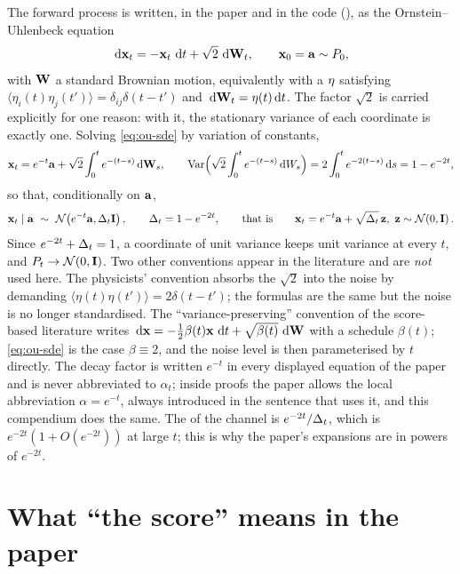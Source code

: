 The forward process is written, in the paper and in the code
(), as the Ornstein--Uhlenbeck equation
\begin{equation}
  \,\mathrm{d}\mathbf{x}_t=-\mathbf{x}_t\,\,\mathrm{d} t+\sqrt2\,\,\mathrm{d}\mathbf{W}_t,\qquad \mathbf{x}_0=\mathbf{a}\sim P_0,
  \label{eq:ou-sde}
\end{equation}
with $\mathbf{W}$ a standard Brownian motion, equivalently with a  $\mathbf{\eta}$ satisfying $\langle\eta_i(t)\eta_j(t')\rangle=\delta_{ij}\delta(t-t')$
and $\,\mathrm{d}\mathbf{W}_t=\mathbf{\eta}(t)\,\mathrm{d} t$. The factor $\sqrt2$ is carried explicitly for one
reason: with it, the stationary variance of each coordinate is exactly one. Solving
\cref{eq:ou-sde} by variation of constants,
\begin{equation}
  \mathbf{x}_t=e^{-t}\mathbf{a}+\sqrt2\int_0^te^{-(t-s)}\,\mathrm{d}\mathbf{W}_s,
  \qquad
  \operatorname{Var}\Bigl(\sqrt2\int_0^te^{-(t-s)}\,\mathrm{d} W_s\Bigr)=2\int_0^te^{-2(t-s)}\,\mathrm{d} s=1-e^{-2t},
\end{equation}
so that, conditionally on $\mathbf{a}$,
\begin{equation}
  \vx_t\mid\va\ \sim\ \normal{e^{-t}\va}{\Dt\Id},\qquad \Dt=1-e^{-2t},
  \qquad\text{that is}\qquad \vx_t=e^{-t}\va+\sqrt{\Dt}\,\vz,\ \vz\sim\normal{0}{\Id}.
  \label{eq:channel-conv}
\end{equation}
Since $e^{-2t}+\Delta_t=1$, a coordinate of unit variance keeps unit variance at every $t$,
and $P_t\to\mathcal{N}\!\left(0,\mathbf{I}\right)$. Two other conventions appear in the literature and are
\emph{not} used here. The physicists' convention absorbs the $\sqrt2$ into the noise
by demanding $\langle\eta(t)\eta(t')\rangle=2\delta(t-t')$; the formulas are the same
but the noise is no longer standardised. The ``variance-preserving'' convention of the
score-based literature writes $\,\mathrm{d}\mathbf{x}=-\tfrac12\beta(t)\mathbf{x}\,\,\mathrm{d} t+\sqrt{\beta(t)}\,\,\mathrm{d}\mathbf{W}$
with a schedule $\beta(t)$; \cref{eq:ou-sde} is the case $\beta\equiv2$, and the
noise level is then parameterised by $t$ directly. The decay factor is written
$e^{-t}$ in every displayed equation of the paper and is never abbreviated to
$\alpha_t$; inside proofs the paper allows the local abbreviation $\alpha=e^{-t}$,
always introduced in the sentence that uses it, and this compendium does the same.
The  of the channel is $e^{-2t}/\Delta_t$, which is
$e^{-2t}(1+O(e^{-2t}))$ at large $t$; this is why the paper's expansions are in
powers of $e^{-2t}$.

\section{What ``the score'' means in the paper}

